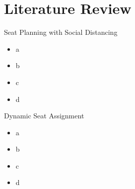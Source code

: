 
\section{Literature Review}
    \frame{\sectionpage}

    \begin{frame}{Seat Planning with Social Distancing}
      \begin{itemize}
        \item a
        \item b
        \item c
        \item d 
      \end{itemize}
      \end{frame}
      
      \begin{frame}{Dynamic Seat Assignment}
        \begin{itemize}
          \item a
          \item b
          \item c
          \item d
        \end{itemize}
      \end{frame}